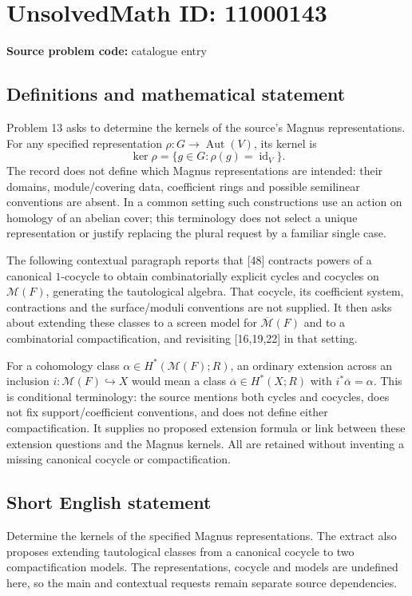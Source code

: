 \documentclass[11pt]{article}
\begin{document}
\section*{UnsolvedMath ID: 11000143}
\textbf{Source problem code:} catalogue entry
\subsection{Definitions and mathematical statement}
Problem 13 asks to determine the kernels of the source's Magnus representations. For any specified representation \(\rho:G\to\operatorname{Aut}(V)\), its kernel is
\[
 \ker\rho=\{g\in G:\rho(g)=\operatorname{id}_V\}.
\]
The record does not define which Magnus representations are intended: their domains, module/covering data, coefficient rings and possible semilinear conventions are absent. In a common setting such constructions use an action on homology of an abelian cover; this terminology does not select a unique representation or justify replacing the plural request by a familiar single case.

The following contextual paragraph reports that [48] contracts powers of a canonical \(1\)-cocycle to obtain combinatorially explicit cycles and cocycles on \(\mathcal M(F)\), generating the tautological algebra. That cocycle, its coefficient system, contractions and the surface/moduli conventions are not supplied. It then asks about extending these classes to a screen model for \(\overline{\mathcal M}(F)\) and to a combinatorial compactification, and revisiting [16,19,22] in that setting.

For a cohomology class \(\alpha\in H^*(\mathcal M(F);R)\), an ordinary extension across an inclusion \(i:\mathcal M(F)\hookrightarrow X\) would mean a class \(\overline\alpha\in H^*(X;R)\) with \(i^*\overline\alpha=\alpha\). This is conditional terminology: the source mentions both cycles and cocycles, does not fix support/coefficient conventions, and does not define either compactification. It supplies no proposed extension formula or link between these extension questions and the Magnus kernels. All are retained without inventing a missing canonical cocycle or compactification.
\subsection{Short English statement}
Determine the kernels of the specified Magnus representations. The extract also proposes extending tautological classes from a canonical cocycle to two compactification models. The representations, cocycle and models are undefined here, so the main and contextual requests remain separate source dependencies.
\end{document}
